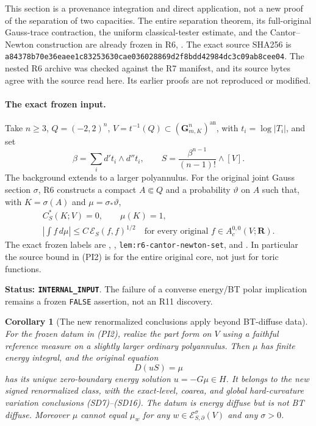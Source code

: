 \documentclass[11pt,a4paper]{article}
\numberwithin{equation}{section}
\newtheorem{corollary}[theorem]{Corollary}
\theoremstyle{definition}
\theoremstyle{remark}
\begin{document}
This section is a provenance integration and direct application,
not a new proof of the separation of two capacities.
The entire separation theorem, its full-original Gauss-trace
contraction, the uniform classical-tester estimate, and the
Cantor--Newton construction are already frozen in R6,
.
The exact source SHA256 is
{\small\nolinkurl{a84378b70e36eaee1c83253630cae036028869d2f8bdd42984dc3c09ab8cee04}}.
The nested R6 archive was checked against the R7 manifest,
and its source bytes agree with the source read here.
Its earlier proofs are not reproduced or modified.

\paragraph{The exact frozen input.}
Take $n\geq3$, $Q=(-2,2)^n$,
$V=t^{-1}(Q)\subset(\mathbf G_{m,K}^n)^{\mathrm{an}}$,
with $t_i=\log|T_i|$, and set
\[
 \beta=\sum_i d't_i\wedge d''t_i,\qquad
 S=\frac{\beta^{n-1}}{(n-1)!}\wedge[V].
 \tag{PI1}
\]
The background extends to a larger polyannulus.
For the original joint Gauss section $\sigma$, R6 constructs
a compact $A\Subset Q$ and a probability $\vartheta$ on $A$
such that, with $K=\sigma(A)$ and $\mu=\sigma_*\vartheta$,
\[
\begin{gathered}
 C_S^*(K;V)=0,\qquad \mu(K)=1,\\
 \left|\int f\,d\mu\right|
       \leq C\,\mathcal E_S(f,f)^{1/2}
       \quad\text{for every original }f\in A_c^{0,0}(V;\mathbf R).
\end{gathered}
 \tag{PI2}
\]
The exact frozen labels are
,
,
\texttt{lem:r6-cantor-newton-set}, and
.
In particular the source bound in (PI2) is for the entire
original core, not just for toric functions.

\noindent\textbf{Status: \texttt{INTERNAL\_INPUT}}.
The failure of a converse energy/BT polar implication remains
a frozen \texttt{FALSE} assertion, not an R11 discovery.

\begin{corollary}[The new renormalized conclusions apply beyond BT-diffuse data]
\label{cor:r11-energy-source-beyond-BT-diffuse}
For the frozen datum in (PI2), realize the part form on $V$
using a faithful reference measure on a slightly larger
ordinary polyannulus.  Then $\mu$ has finite energy integral,
and the original equation
\[
                         D(uS)=\mu
 \tag{PI3}
\]
has its unique zero-boundary energy solution $u=-G\mu\in H$.
It belongs to the new signed renormalized class, with the
exact-level, coarea, and global hard-curvature variation
conclusions (SD7)--(SD16).
The datum is energy diffuse but is not BT diffuse.
Moreover $\mu$ cannot equal $\mu_w$ for any
$w\in\mathcal E^\sigma_{S,\partial}(V)$ and any $\sigma>0$.
\end{corollary}
\end{document}
